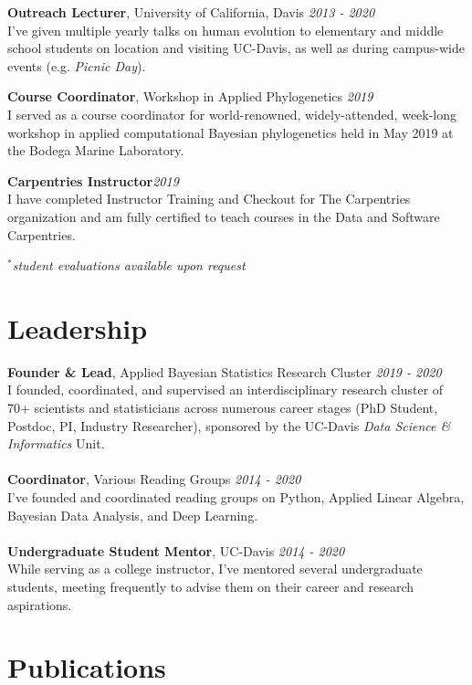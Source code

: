 \documentclass[12pt]{article}
\begin{document}
\textbf{Outreach Lecturer}, University of California, Davis \hfill \emph{2013  - 2020}\\
I've given multiple yearly talks on human evolution to elementary and middle school students on location and visiting UC-Davis, as well as during campus-wide events (e.g. \emph{Picnic Day}).

\textbf{Course Coordinator}, Workshop in Applied Phylogenetics \hfill \emph{2019}\\
I served as a course coordinator for world-renowned, widely-attended, week-long workshop in applied computational Bayesian phylogenetics held in May 2019 at the Bodega Marine Laboratory.

\textbf{Carpentries Instructor}\hfill \emph{2019}\\
I have completed Instructor Training and Checkout for The Carpentries organization and am fully certified to teach courses in the Data and Software Carpentries.

$^{*}$\emph{student evaluations available upon request}
\section{Leadership}

\textbf{Founder \& Lead}, Applied Bayesian Statistics Research Cluster \hfill \emph{2019 - 2020}\\
I founded, coordinated, and supervised an interdisciplinary research cluster of 70+ scientists and statisticians across numerous career stages (PhD Student, Postdoc, PI, Industry Researcher), sponsored by the UC-Davis \emph{Data Science \& Informatics} Unit.\\\\
\textbf{Coordinator}, Various Reading Groups \hfill \emph{2014 - 2020}\\
I've founded and coordinated reading groups on Python, Applied Linear Algebra, Bayesian Data Analysis, and Deep Learning.\\\\
\textbf{Undergraduate Student Mentor}, UC-Davis \hfill \emph{2014 - 2020}\\
While serving as a college instructor, I've mentored several undergraduate students, meeting frequently to advise them on their career and research aspirations.

\section{Publications}
\end{document}
